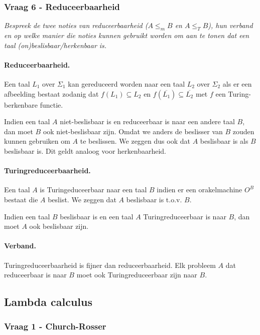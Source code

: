 \subsubsection{Vraag 6 - Reduceerbaarheid}

\textit{Bespreek de twee noties van reduceerbaarheid ($A \leq_m B$ en $A \leq_T B$), hun verband en op welke manier die noties kunnen gebruikt worden om aan te tonen dat een taal (on)beslisbaar/herkenbaar is.}

\paragraph{Reduceerbaarheid.} Een taal $L_1$ over $\Sigma_1$ kan gereduceerd worden naar een taal $L_2$ over $\Sigma_2$ als er een afbeelding  bestaat zodanig dat $f(L_1) \subseteq L_2$ en $f(\overline{L_1}) \subseteq \overline{L_2}$ met $f$ een Turing-berkenbare functie.

Indien een taal $A$ niet-beslisbaar is en reduceerbaar is naar een andere taal $B$, dan moet $B$ ook niet-beslisbaar zijn. Omdat we anders de beslisser van $B$ zouden kunnen gebruiken om $A$ te beslissen. We zeggen dus ook dat $A$ beslisbaar is als $B$ beslisbaar is. Dit geldt analoog voor herkenbaarheid.

\paragraph{Turingreduceerbaarheid.} Een taal $A$ is Turingeduceerbaar naar een taal $B$ indien er een orakelmachine $O^B$ bestaat die $A$ beslist. We zeggen dat $A$ beslisbaar is t.o.v. $B$.

Indien een taal $B$ beslisbaar is en een taal $A$ Turingreduceerbaar is naar $B$, dan moet $A$ ook beslisbaar zijn.

\paragraph{Verband.} Turingreduceerbaarheid is fijner dan reduceerbaarheid. Elk probleem $A$ dat reduceerbaar is naar $B$ moet ook Turingreduceerbaar zijn naar $B$.

\subsection{Lambda calculus}

\subsubsection{Vraag 1 - Church-Rosser}

